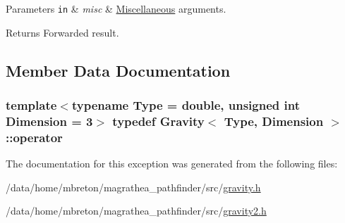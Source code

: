 \begin{DoxyParams}[1]{Parameters}
\mbox{\tt in}  & {\em misc} & \hyperlink{classMiscellaneous}{Miscellaneous} arguments. \\
\hline
\end{DoxyParams}
\begin{DoxyReturn}{Returns}
Forwarded result. 
\end{DoxyReturn}


\subsection{Member Data Documentation}
\hypertarget{exceptionGravity_a4e52df4c0e4c53d5e34331510c1083d7}{
\subsubsection[{operator}]{\setlength{\rightskip}{0pt plus 5cm}template$<$typename Type  = double, unsigned int Dimension = 3$>$ typedef {\bf Gravity}$<$ Type, Dimension $>$\-::operator}}\label{exceptionGravity_a4e52df4c0e4c53d5e34331510c1083d7}


The documentation for this exception was generated from the following files\-:\begin{DoxyCompactItemize}
\item 
/data/home/mbreton/magrathea\-\_\-pathfinder/src/\hyperlink{gravity_8h}{gravity.\-h}\item 
/data/home/mbreton/magrathea\-\_\-pathfinder/src/\hyperlink{gravity2_8h}{gravity2.\-h}\end{DoxyCompactItemize}
